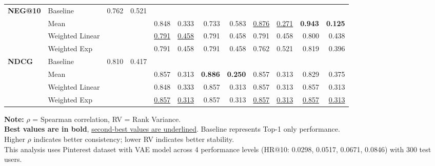 \documentclass{article}
\begin{document}
\begin{table}[htbp]
\begin{tabular}{@{}llrr|rr|rr|rr|rr@{}}
\multirow{4}{*}{\textbf{NEG@10}} 
& Baseline & 0.762 & 0.521 & & & & & & & & \\
& Mean & & & 0.848 & 0.333 & 0.733 & 0.583 & \uline{0.876} & \uline{0.271} & \textbf{0.943} & \textbf{0.125} \\
& Weighted Linear & & & \uline{0.791} & \uline{0.458} & 0.791 & 0.458 & 0.791 & 0.458 & 0.800 & 0.438 \\
& Weighted Exp & & & 0.791 & 0.458 & 0.791 & 0.458 & 0.762 & 0.521 & 0.819 & 0.396 \\
\midrule

\multirow{4}{*}{\textbf{NDCG}} 
& Baseline & 0.810 & 0.417 & & & & & & & & \\
& Mean & & & 0.857 & 0.313 & \textbf{0.886} & \textbf{0.250} & 0.857 & 0.313 & 0.829 & 0.375 \\
& Weighted Linear & & & 0.848 & 0.333 & 0.857 & 0.313 & 0.857 & 0.313 & 0.857 & 0.313 \\
& Weighted Exp & & & \uline{0.857} & \uline{0.313} & 0.857 & 0.313 & \uline{0.857} & \uline{0.313} & \uline{0.857} & \uline{0.313} \\

\bottomrule
\end{tabular}
\begin{flushleft}
\textbf{Note:} $\rho$ = Spearman correlation, RV = Rank Variance. \\
\textbf{Best values are in bold}, \uline{second-best values are underlined}. Baseline represents Top-1 only performance. \\
Higher $\rho$ indicates better consistency; lower RV indicates better stability. \\
This analysis uses Pinterest dataset with VAE model across 4 performance levels (HR@10: 0.0298, 0.0517, 0.0671, 0.0846) with 300 test users.
\end{flushleft}
\end{table}
\end{document}

